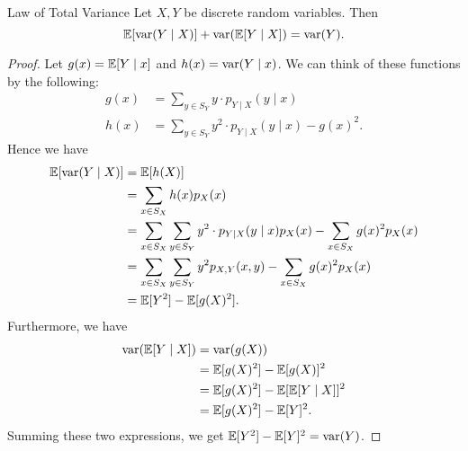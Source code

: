 \documentclass[class=article, crop=false]{standalone}
\begin{document}
  \begin{theorem}{Law of Total Variance}
    Let $X, Y$ be discrete random variables. Then
    \[
      \mathbb{E}[\operatorname{var}(Y\mid X)] + \operatorname{var}(\mathbb{E}[Y\mid X]) = \operatorname{var}(Y).
    \]
    \begin{proof}
      Let $g(x) = \mathbb{E}[Y\mid x]$ and $h(x) = \operatorname{var}(Y\mid x)$. We can think of these functions by the following:
      \begin{align*}
        g(x) &= \sum_{y\in S_Y} y\cdot p_{Y\mid X}(y\mid x) \\
        h(x) &= \sum_{y\in S_Y} y^2\cdot p_{Y\mid X}(y\mid x) - g(x)^2.
      \end{align*}
      Hence we have
      \begin{align*}
        \mathbb{E}[\operatorname{var}(Y\mid X)] &= \mathbb{E}[h(X)] \\
                          &= \sum_{x\in S_X}h(x)p_X(x) \\
                          &= \sum_{x\in S_X}\sum_{y\in S_Y}y^2\cdot p_{Y\mid X}(y\mid x)p_X(x) - \sum_{x\in S_X}g(x)^2p_X(x) \\
                          &= \sum_{x\in S_X}\sum_{y\in S_Y}y^2p_{X, Y}(x, y) - \sum_{x\in S_X}g(x)^2p_X(x) \\
                          &= \mathbb{E}[Y^2] - \mathbb{E}[g(X)^2].
      \end{align*}
      Furthermore, we have
      \begin{align*}
        \operatorname{var}(\mathbb{E}[Y\mid X]) &= \operatorname{var}(g(X)) \\
                          &= \mathbb{E}[g(X)^2] - \mathbb{E}[g(X)]^2 \\
                          &= \mathbb{E}[g(X)^2] - \mathbb{E}[\mathbb{E}[Y\mid X]]^2 \\
                          &= \mathbb{E}[g(X)^2] - \mathbb{E}[Y]^2.
      \end{align*}
      Summing these two expressions, we get $\mathbb{E}[Y^2] - \mathbb{E}[Y]^2 = \operatorname{var}(Y)$.
    \end{proof}
  \end{theorem}
\end{document}
